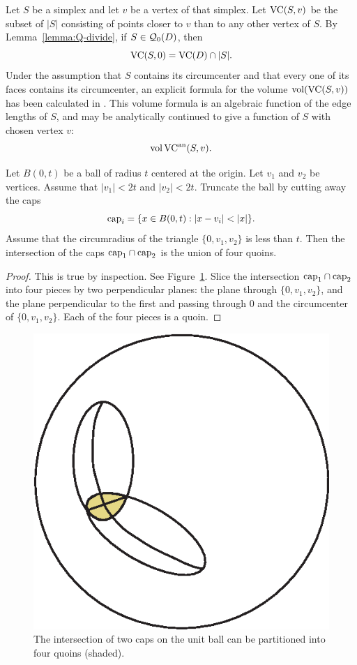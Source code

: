 Let $S$ be a simplex and let $v$ be a vertex of that simplex. Let
${\operatorname{VC}}(S,v)$ be the subset of $|S|$ consisting of points closer
to $v$ than to any other vertex of $S$. By
Lemma~\ref{lemma:Q-divide}, if $S\in{\mathcal Q}_0(D)$, then
$${\operatorname{VC}}(S,0) = {\operatorname{VC}}(D)\cap |S|.$$
Under the assumption that $S$ contains its circumcenter and that
every one of its faces contains its circumcenter, an explicit
formula for the volume ${\operatorname{vol}}({\operatorname{VC}}(S,v))$ has been
calculated in \cite[Section~8.6.3]{part1}. This volume formula is
an algebraic function of the edge lengths of $S$, and may be
analytically continued to give a function of $S$ with chosen
vertex $v$:
  $${\operatorname{vol}}\,{\operatorname{VC}}^{\operatorname{an}}(S,v).$$

\begin{lemma}\label{lemma:cap-rogers}
Let $B(0,t)$ be a ball of radius $t$ centered at the origin.  Let
$v_1$ and $v_2$ be vertices.  Assume that $|v_1|< 2t$ and $|v_2|<2
t$.  Truncate the ball by cutting away the caps
   $${\operatorname{cap}}_i = \{x\in B(0,t) :  |x- v_i| < |x|\}.$$
Assume that the circumradius of the triangle $\{0,v_1,v_2\}$ is
less than $t$. Then the intersection of the caps ${\operatorname{cap}}_1\cap
{\operatorname{cap}}_2$ is the union of four quoins.
\end{lemma}

\begin{proof} This is true by inspection.  See Figure~\ref{fig:capriquoin}.
Slice the intersection ${\operatorname{cap}}_1\cap{\operatorname{cap}}_2$ into four pieces
by two perpendicular planes: the plane through $\{0,v_1,v_2\}$,
and the plane perpendicular to the first and passing through $0$
and the circumcenter of $\{0,v_1,v_2\}$.  Each of the four pieces
is a quoin.
\end{proof}

\begin{figure}[htb]
  \centering
  \includegraphics{PS/capriquoin.eps}
  \caption{The intersection of two caps on the unit ball can
   be partitioned into four quoins (shaded).}
  \label{fig:capriquoin}
\end{figure}

